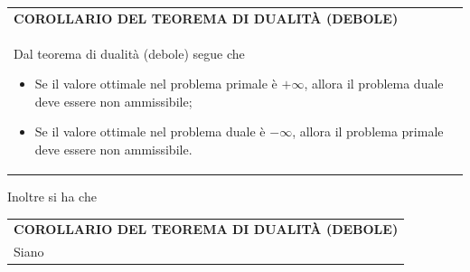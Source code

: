 \documentclass[a4paper]{extarticle}
\renewcommand\arraystretch{}
\begin{document}
\vspace{1em}
\setlength{\tabcolsep}{14pt}
\renewcommand{\arraystretch}{2}
\noindent
\begin{tabularx}{\textwidth}{@{}|P|@{}}
    \hline
    {\textbf{COROLLARIO DEL TEOREMA DI DUALITÀ (DEBOLE)}}\\
    \parbox{\linewidth}{Dal teorema di dualità (debole) segue che
    \begin{itemize}
        \item Se il valore ottimale nel problema primale è $+\infty$, allora il problema duale deve essere non ammissibile;
        \item Se il valore ottimale nel problema duale è $-\infty$, allora il problema primale deve essere non ammissibile.
    \end{itemize}
    \vspace{1mm}}\\
    \hline
\end{tabularx}

\vspace{2em}
\noindent

\vspace{2em}
\noindent
Inoltre si ha che 

\vspace{1em}
\setlength{\tabcolsep}{14pt}
\renewcommand{\arraystretch}{2}
\noindent
\begin{tabularx}{\textwidth}{@{}|P|@{}}
    \hline
    {\textbf{COROLLARIO DEL TEOREMA DI DUALITÀ (DEBOLE)}}\\
    \parbox{\linewidth}{Siano %
    \vspace{1mm}}\\
    \hline
\end{tabularx}
\end{document}
